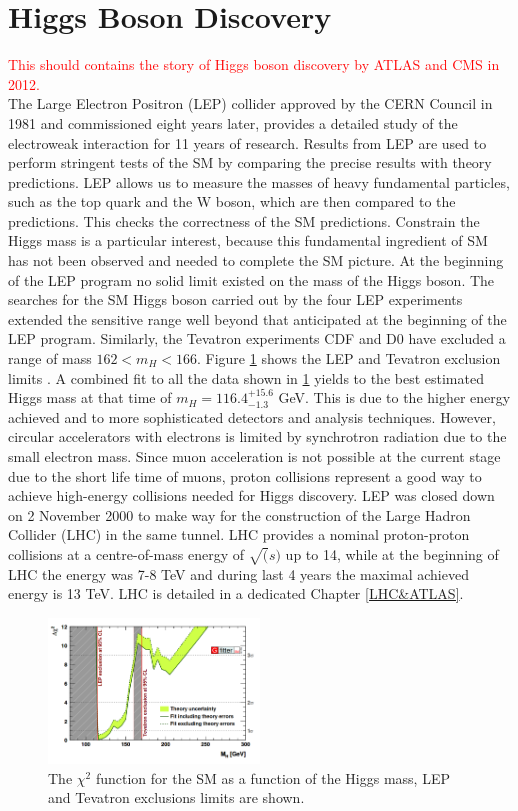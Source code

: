\section{Higgs Boson Discovery}
\label{chap1:H2012}
\textcolor{red}{This should contains the story of Higgs boson discovery by ATLAS and CMS in 2012. \\}
The Large Electron Positron (LEP) collider approved by the CERN Council in 1981 and commissioned eight years later, provides a detailed study of the electroweak interaction for 11 years of research. Results from LEP are used to perform stringent tests of the SM by comparing the precise results with theory predictions. LEP allows us to measure the masses of heavy fundamental particles, such as the top quark and the W boson, which are then compared to the predictions. This checks the correctness of the SM predictions. Constrain the Higgs mass is a particular interest, because this fundamental ingredient of SM has not been observed and needed to complete the SM picture. At the beginning of the LEP program no solid limit existed on the mass of the Higgs boson. The searches for the SM Higgs boson carried out by the four LEP experiments extended the sensitive range well beyond that anticipated at the beginning of the LEP program. Similarly, the Tevatron experiments CDF and D0 have excluded a range of mass $162 < m_{H} < 166$. Figure \ref{fig:chap1:H2012:LEP} shows the LEP and Tevatron exclusion limits \cite{LEP, Tevatron, LEP_Tevatron}. A combined fit to all the data shown in \ref{fig:chap1:H2012:LEP} yields to the best estimated Higgs mass at that time of $m_{H} = 116.4^{+15.6}_{-1.3}$ GeV. This is due to the higher energy achieved and to more sophisticated detectors and analysis techniques. However, circular accelerators with electrons is limited by synchrotron radiation due to the small electron mass. Since muon acceleration is not possible at the current stage due to the short life time of muons, proton collisions represent a good way to achieve high-energy collisions needed for Higgs discovery. LEP was closed down on 2 November 2000 to make way for the construction of the Large Hadron Collider (LHC) in the same tunnel. LHC provides a nominal proton-proton collisions at a centre-of-mass energy of $\sqrt(s)$ up to 14, while at the beginning of LHC the energy was 7-8 TeV and during last 4 years the maximal achieved energy is 13 TeV. LHC is detailed in a dedicated Chapter \ref{LHC&ATLAS}. 
\begin{figure}[H]
    \centering
    \includegraphics[width=0.5\textwidth]{Ch1/Img/LEP_Tevatron_limits.png}
    \caption{The $\chi^2$ function for the SM as a function of the Higgs mass, LEP and Tevatron exclusions limits are shown.}
    \label{fig:chap1:H2012:LEP}
\end{figure}
